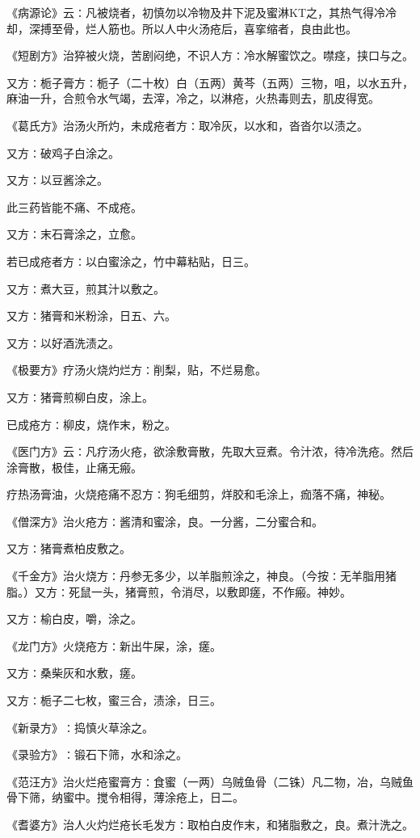 \documentclass[a4paper,12pt,UTF8,twoside]{ctexbook}
\begin{document}
《病源论》云∶凡被烧者，初慎勿以冷物及井下泥及蜜淋KT之，其热气得冷冷却，深搏至骨，烂人筋也。所以人中火汤疮后，喜挛缩者，良由此也。

《短剧方》治猝被火烧，苦剧闷绝，不识人方∶冷水解蜜饮之。噤痉，挟口与之。

又方∶栀子膏方∶栀子（二十枚）白（五两）黄芩（五两）三物，咀，以水五升，麻油一升，合煎令水气竭，去滓，冷之，以淋疮，火热毒则去，肌皮得宽。

《葛氏方》治汤火所灼，未成疮者方∶取冷灰，以水和，沓沓尔以渍之。

又方∶破鸡子白涂之。

又方∶以豆酱涂之。

此三药皆能不痛、不成疮。

又方∶末石膏涂之，立愈。

若已成疮者方∶以白蜜涂之，竹中幕粘贴，日三。

又方∶煮大豆，煎其汁以敷之。

又方∶猪膏和米粉涂，日五、六。

又方∶以好酒洗渍之。

《极要方》疗汤火烧灼烂方∶削梨，贴，不烂易愈。

又方∶猪膏煎柳白皮，涂上。

已成疮方∶柳皮，烧作末，粉之。

《医门方》云∶凡疗汤火疮，欲涂敷膏散，先取大豆煮。令汁浓，待冷洗疮。然后涂膏散，极佳，止痛无瘢。

疗热汤膏油，火烧疮痛不忍方∶狗毛细剪，烊胶和毛涂上，痂落不痛，神秘。

《僧深方》治火疮方∶酱清和蜜涂，良。一分酱，二分蜜合和。

又方∶猪膏煮柏皮敷之。

《千金方》治火烧方∶丹参无多少，以羊脂煎涂之，神良。（今按∶无羊脂用猪脂。）又方∶死鼠一头，猪膏煎，令消尽，以敷即瘥，不作瘢。神妙。

又方∶榆白皮，嚼，涂之。

《龙门方》火烧疮方∶新出牛屎，涂，瘥。

又方∶桑柴灰和水敷，瘥。

又方∶栀子二七枚，蜜三合，渍涂，日三。

《新录方》∶捣慎火草涂之。

《录验方》∶锻石下筛，水和涂之。

《范汪方》治火烂疮蜜膏方∶食蜜（一两）乌贼鱼骨（二铢）凡二物，冶，乌贼鱼骨下筛，纳蜜中。搅令相得，薄涂疮上，日二。

《耆婆方》治人火灼烂疮长毛发方∶取柏白皮作末，和猪脂敷之，良。煮汁洗之。
\end{document}
